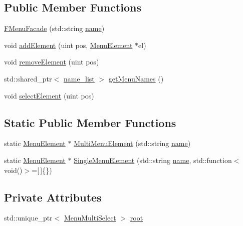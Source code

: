\subsection*{Public Member Functions}
\begin{DoxyCompactItemize}
\item 
\hyperlink{classFMenuFacade_acf26e00c686baac8da8b8f5e9eff3588}{F\+Menu\+Facade} (std\+::string \hyperlink{classFMenuFacade_ad7061aee91a27742df50a0ee7c0201d2}{name})
\item 
void \hyperlink{classFMenuFacade_a6f1b7f4b1ab3bf079fac28cca84445cc}{add\+Element} (uint pos, \hyperlink{classMenuElement}{Menu\+Element} $\ast$el)
\item 
void \hyperlink{classFMenuFacade_af371e6f6404b080c20e82e4355a0842e}{remove\+Element} (uint pos)
\item 
std\+::shared\+\_\+ptr$<$ \hyperlink{classFMenuFacade_a45d184d76216f6ce15b1b8b2fb4febb1}{name\+\_\+list} $>$ \hyperlink{classFMenuFacade_abc6dab5e91340476bc5eb7fcd3292095}{get\+Menu\+Names} ()
\item 
void \hyperlink{classFMenuFacade_a233201511b3316bcdeb2e772ef9a1700}{select\+Element} (uint pos)
\end{DoxyCompactItemize}
\subsection*{Static Public Member Functions}
\begin{DoxyCompactItemize}
\item 
static \hyperlink{classMenuElement}{Menu\+Element} $\ast$ \hyperlink{classFMenuFacade_a077a600d4fc54cbab61ffdfd4a4d0e8e}{Multi\+Menu\+Element} (std\+::string \hyperlink{classFMenuFacade_ad7061aee91a27742df50a0ee7c0201d2}{name})
\item 
static \hyperlink{classMenuElement}{Menu\+Element} $\ast$ \hyperlink{classFMenuFacade_afcf19a803927ea2fd6c86ad2576c7629}{Single\+Menu\+Element} (std\+::string \hyperlink{classFMenuFacade_ad7061aee91a27742df50a0ee7c0201d2}{name}, std\+::function$<$ void()$>$=\mbox{[}$\,$\mbox{]}\{\})
\end{DoxyCompactItemize}
\subsection*{Private Attributes}
\begin{DoxyCompactItemize}
\item 
std\+::unique\+\_\+ptr$<$ \hyperlink{classMenuMultiSelect}{Menu\+Multi\+Select} $>$ \hyperlink{classFMenuFacade_a00f246d05e03d88232a3b837584ab966}{root}
\end{DoxyCompactItemize}


